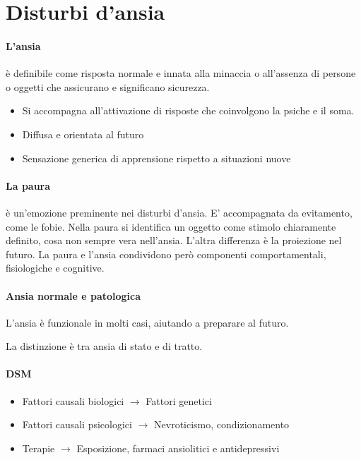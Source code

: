 
\section{Disturbi d'ansia}

\paragraph{L'ansia} è definibile come risposta normale e innata alla minaccia o all'assenza di persone o oggetti che assicurano e significano sicurezza.
\begin{itemize}
	\item Si accompagna all'attivazione di risposte che coinvolgono la psiche e il soma.
	\item Diffusa e orientata al futuro
	\item Sensazione generica di apprensione rispetto a situazioni nuove
\end{itemize}

\paragraph{La paura} è un'emozione preminente nei disturbi d'ansia. E' accompagnata da evitamento, come le fobie.
Nella paura si identifica un oggetto come stimolo chiaramente definito, cosa non sempre vera nell'ansia. L'altra differenza è la proiezione nel futuro.
La paura e l'ansia condividono però componenti comportamentali, fisiologiche e cognitive.


\paragraph{Ansia normale e patologica}  L'ansia è funzionale in molti casi, aiutando a preparare al futuro. 

La distinzione è tra ansia di stato e di tratto.

\paragraph{DSM} 
\begin{itemize}
	\item Fattori causali biologici $\rightarrow$ Fattori genetici
	\item Fattori causali psicologici $\rightarrow$ Nevroticismo, condizionamento
	\item Terapie $\rightarrow$ Esposizione, farmaci ansiolitici e antidepressivi


\end{itemize}
